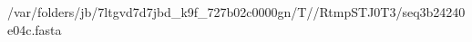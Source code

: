 \documentclass[10pt]{article}
\begin{document}
\begin{texshade}{/var/folders/jb/7ltgvd7d7jbd_k9f_727b02c0000gn/T//RtmpSTJ0T3/seq3b24240e04c.fasta}
\hidelogoscale
{}
\showlegend
\end{texshade}
\end{document}

